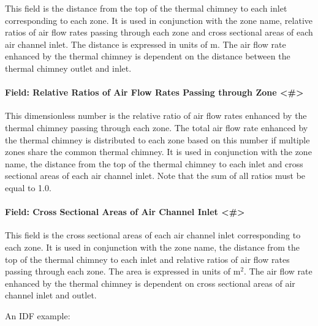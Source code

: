 This field is the distance from the top of the thermal chimney to each inlet corresponding to each zone. It is used in conjunction with the zone name, relative ratios of air flow rates passing through each zone and cross sectional areas of each air channel inlet. The distance is expressed in units of m. The air flow rate enhanced by the thermal chimney is dependent on the distance between the thermal chimney outlet and inlet.

\paragraph{Field: Relative Ratios of Air Flow Rates Passing through Zone \textless{}\#\textgreater{}}\label{field-relative-ratios-of-air-flow-rates-passing-through-zone}

This dimensionless number is the relative ratio of air flow rates enhanced by the thermal chimney passing through each zone. The total air flow rate enhanced by the thermal chimney is distributed to each zone based on this number if multiple zones share the common thermal chimney. It is used in conjunction with the zone name, the distance from the top of the thermal chimney to each inlet and cross sectional areas of each air channel inlet. Note that the sum of all ratios must be equal to 1.0.

\paragraph{Field: Cross Sectional Areas of Air Channel Inlet \textless{}\#\textgreater{}}\label{field-cross-sectional-areas-of-air-channel-inlet}

This field is the cross sectional areas of each air channel inlet corresponding to each zone. It is used in conjunction with the zone name, the distance from the top of the thermal chimney to each inlet and relative ratios of air flow rates passing through each zone. The area is expressed in units of m\(^{2}\). The air flow rate enhanced by the thermal chimney is dependent on cross sectional areas of air channel inlet and outlet.

An IDF example:

